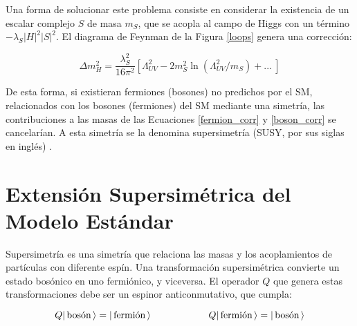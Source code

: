 Una forma de solucionar este problema consiste en considerar la existencia de un escalar complejo $S$ de masa $m_{S}$, que se acopla al campo de Higgs con un término $-\lambda_{S} |H|^{2}|S|^{2}$. El diagrama de Feynman de la Figura \ref{loops} genera una corrección:

\begin{equation}
\Delta m_{H}^{2}=\frac{\lambda_{S}^{2}}{16\pi^{2}}\left[\Lambda_{UV}^{2}-2m_{S}^{2}\ln(\Lambda_{UV}^{2}/m_{S})+... \:\right]
\label{boson_corr}
\end{equation}


De esta forma, si existieran fermiones (bosones) no predichos por el SM, relacionados con los bosones (fermiones) del SM mediante una simetría, las contribuciones a las masas de las Ecuaciones \ref{fermion_corr} y \ref{boson_corr} se cancelarían. A esta simetría se la denomina supersimetría (SUSY, por sus siglas en inglés) \cite{Martin:1997ns}.


\section{Extensión Supersimétrica del Modelo Estándar}

Supersimetría es una simetría que relaciona las masas y los acoplamientos de partículas con diferente espín. Una transformación supersimétrica convierte un estado bosónico en uno fermiónico, y viceversa. El operador $Q$ que genera estas transformaciones debe ser un espinor anticonmutativo, que cumpla:

\begin{equation}
\centering
Q \ket{\text{\,bosón\,}} = \ket{\text{\,fermión\,}}
\qquad\qquad\qquad
Q \ket{\text{\,fermión\,}} = \ket{\text{\,bosón\,}}
\end{equation}

